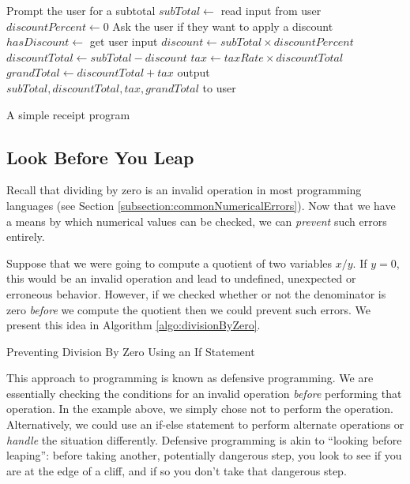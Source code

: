 \begin{algorithm}[H]
Prompt the user for a subtotal \;
$subTotal \leftarrow $ read input from user \;
$discountPercent \leftarrow 0$ \;
Ask the user if they want to apply a discount \;
$hasDiscount \leftarrow $ get user input
$discount \leftarrow subTotal \times discountPercent$ \;
$discountTotal \leftarrow subTotal - discount$ \;
$tax \leftarrow taxRate \times discountTotal$ \;
$grandTotal \leftarrow discountTotal + tax$ \;
output $subTotal, discountTotal, tax, grandTotal$ to user \;
\caption{A simple receipt program}
\label{algo:receiptProgram}
\end{algorithm}

\subsection{Look Before You Leap}

Recall that dividing by zero is an invalid operation in most programming languages 
(see Section \ref{subsection:commonNumericalErrors}).  Now that we have a means by
which numerical values can be checked, we can \emph{prevent} such errors
entirely.  

Suppose that we were going to compute a quotient of two variables $x / y$.  If $y = 0$, this
would be an invalid operation and lead to undefined, unexpected or erroneous behavior.  
However, if we checked whether or not the denominator is zero \emph{before} we compute
the quotient then we could prevent such errors.  We present this idea in Algorithm \ref{algo:divisionByZero}.

\begin{algorithm}[H]
\caption{Preventing Division By Zero Using an If Statement}
\label{algo:divisionByZero}
\end{algorithm}

This approach to programming is known as \gls{defensive programming}.  We are essentially
checking the conditions for an invalid operation \emph{before} performing that operation.  
In the example above, we simply chose not to perform the operation.  Alternatively, we could
use an if-else statement to perform alternate operations or \emph{handle} the situation
differently.  Defensive programming is akin to ``looking before leaping'': before taking another,
potentially dangerous step, you look to see if you are at the edge of a cliff, and if so you 
don't take that dangerous step.


